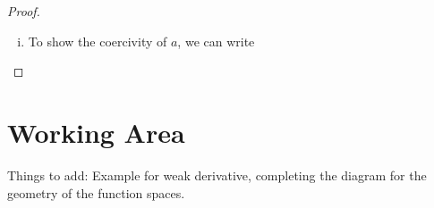 \begin{proof}
\begin{enumerate}[(i)]
\begin{align*}
{				+ \norm{u}_{L_2}\norm{v}_{L_2} 
			}\\
			&\leq \hat{c}\Par{\norm{v}_{L_2} + \sum_{j=1}^{n}\norm{\partial_j v}_{L_2}}
			\Par{\norm{u}_{L_2} + \sum_{i=1}^{n}\norm{\partial_i u}_{L_2}}\\
			&{\color{red} \boxed{\leq}}\ 2n\hat{c}\Par{\norm{v}_{L_2}^2 + \sum_{j=1}^{n}\norm{\partial_j v}_{L_2}^2}^{1/2}
			\Par{\norm{u}_{L_2}^2 + \sum_{i=1}^{n}\norm{\partial_i u}_{L_2}^2}^{1/2}\\
			&\leq c \norm{v}_{H_1} \norm{u}_{H_1}.
		\end{align*}
		Note that in the argument above, I have highlighted the last inequality as red. That is because I don't know how this step works. This proof is provided at \hyperlink{https://people.maths.ox.ac.uk/suli/fem.pdf}{FEM lecture notes}, and is called a ``further majorization''.
		
		\item To show the coercivity of $ a $, we can write
	\end{enumerate}
\end{proof}

\section{Working Area}
Things to add: Example for weak derivative, completing the diagram for the geometry of the function spaces. 